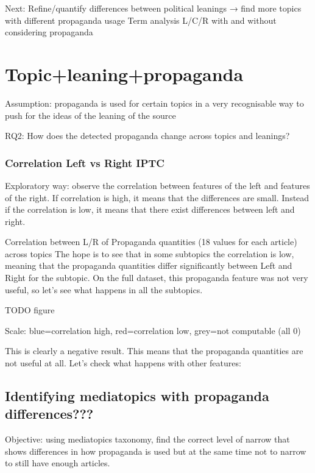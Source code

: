 Next:
Refine/quantify differences between political leanings → find more topics with different propaganda usage
Term analysis L/C/R with and without considering propaganda





\section{\statusred Topic+leaning+propaganda}
\label{sec:topic_propaganda_leaning}

Assumption: propaganda is used for certain topics in a very recognisable way to push for the ideas of the leaning of the source

RQ2: How does the detected propaganda change across topics and leanings? 

\subsubsection{Correlation Left vs Right IPTC}
Exploratory way: observe the correlation between features of the left and features of the right. If correlation is high, it means that the differences are small. Instead if the correlation is low, it means that there exist differences between left and right.


Correlation between L/R of Propaganda quantities (18 values for each article) across topics
The hope is to see that in some subtopics the correlation is low, meaning that the propaganda quantities differ significantly between Left and Right for the subtopic.
On the full dataset, this propaganda feature was not very useful, so let’s see what happens in all the subtopics.

TODO figure

Scale: blue=correlation high, red=correlation low, grey=not computable (all 0)

This is clearly a negative result. This means that the propaganda quantities are not useful at all. Let’s check what happens with other features:


\subsection{Identifying mediatopics with propaganda differences???}

Objective: using mediatopics taxonomy, find the correct level of narrow that shows differences in how propaganda is used but at the same time not to narrow to still have enough articles.

